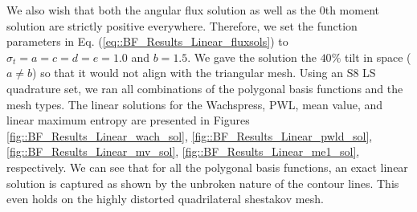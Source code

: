 \noindent We also wish that both the angular flux solution as well as the 0th moment solution are strictly positive everywhere. Therefore, we set the function parameters in Eq. (\ref{eq::BF_Results_Linear_fluxsols}) to $\sigma_t = a = c = d = e = 1.0$ and $b = 1.5$. We gave the solution the $40 \%$ tilt in space ($a \neq b$) so that it would not align with the triangular mesh. Using an S8 LS quadrature set, we ran all combinations of the polygonal basis functions and the mesh types. The linear solutions for the Wachspress, PWL, mean value, and linear maximum entropy are presented in Figures \ref{fig::BF_Results_Linear_wach_sol}, \ref{fig::BF_Results_Linear_pwld_sol}, \ref{fig::BF_Results_Linear_mv_sol}, \ref{fig::BF_Results_Linear_me1_sol}, respectively. We can see that for all the polygonal basis functions, an exact linear solution is captured as shown by the unbroken nature of the contour lines. This even holds on the highly distorted quadrilateral shestakov mesh.

